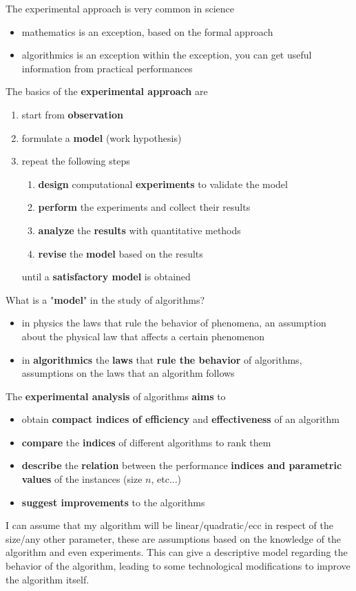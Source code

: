 The experimental approach is very common in science
\begin{itemize}
	\item mathematics is an exception, based on the formal approach
	\item algorithmics is an exception within the exception, you can get useful information from practical performances
\end{itemize}
The basics of the \textbf{experimental approach} are
\begin{enumerate}
	\item start from \textbf{observation}
	\item formulate a \textbf{model} (work hypothesis)
	\item repeat the following steps
	\begin{enumerate}[label=\alph*.]
		\item \textbf{design} computational \textbf{experiments} to validate the model
		\item \textbf{perform} the experiments and collect their results
		\item \textbf{analyze} the \textbf{results} with quantitative methods
		\item \textbf{revise} the \textbf{model} based on the results
	\end{enumerate}
	until a \textbf{satisfactory model} is obtained
\end{enumerate}

\newpage

What is a "\textbf{model}" in the study of algorithms? 
\begin{itemize}
	\item in physics the laws that rule the behavior of phenomena, an assumption about the physical law that affects a certain phenomenon
	\item in \textbf{algorithmics} the \textbf{laws} that \textbf{rule the behavior} of algorithms, assumptions on the laws that an algorithm follows
\end{itemize}

The \textbf{experimental analysis} of algorithms \textbf{aims} to
\begin{itemize}
	\item obtain \textbf{compact indices of efficiency} and \textbf{effectiveness} of an algorithm
	\item \textbf{compare} the \textbf{indices} of different algorithms to rank them
	\item \textbf{describe} the \textbf{relation} between the performance \textbf{indices and parametric values} of the instances (size $n$, etc...)
	\item \textbf{suggest improvements} to the algorithms
\end{itemize}
I can assume that my algorithm will be linear/quadratic/ecc in respect of the size/any other parameter, these are assumptions based on the knowledge of the algorithm and even experiments. This can give a descriptive model regarding the behavior of the algorithm, leading to some technological modifications to improve the algorithm itself.\\

